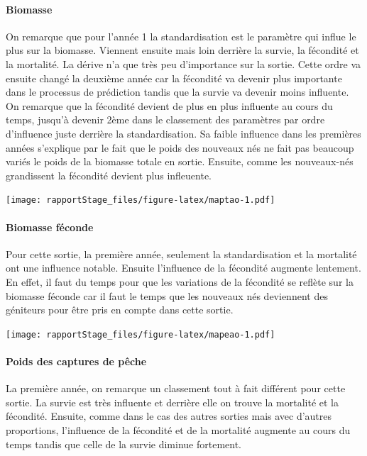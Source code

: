 \documentclass[
]{article}
\begin{document}
\hypertarget{biomasse-7}{%
\paragraph{Biomasse}\label{biomasse-7}}

On remarque que pour l'année 1 la standardisation est le paramètre qui
influe le plus sur la biomasse. Viennent ensuite mais loin derrière la
survie, la fécondité et la mortalité. La dérive n'a que très peu
d'importance sur la sortie. Cette ordre va ensuite changé la deuxième
année car la fécondité va devenir plus importante dans le processus de
prédiction tandis que la survie va devenir moins influente. On remarque
que la fécondité devient de plus en plus influente au cours du temps,
jusqu'à devenir 2ème dans le classement des paramètres par ordre
d'influence juste derrière la standardisation. Sa faible influence dans
les premières années s'explique par le fait que le poids des nouveaux
nés ne fait pas beaucoup variés le poids de la biomasse totale en
sortie. Ensuite, comme les nouveaux-nés grandissent la fécondité devient
plus infleuente.

\texttt{[image: rapportStage\_files/figure-latex/maptao-1.pdf]}

\hypertarget{biomasse-fuxe9conde-1}{%
\paragraph{Biomasse féconde}\label{biomasse-fuxe9conde-1}}

Pour cette sortie, la première année, seulement la standardisation et la
mortalité ont une influence notable. Ensuite l'influence de la fécondité
augmente lentement. En effet, il faut du temps pour que les variations
de la fécondité se reflète sur la biomasse féconde car il faut le temps
que les nouveaux nés deviennent des géniteurs pour être pris en compte
dans cette sortie.

\texttt{[image: rapportStage\_files/figure-latex/mapeao-1.pdf]}

\hypertarget{poids-des-captures-de-puxeache-2}{%
\paragraph{Poids des captures de
pêche}\label{poids-des-captures-de-puxeache-2}}

La première année, on remarque un classement tout à fait différent pour
cette sortie. La survie est très influente et derrière elle on trouve la
mortalité et la fécondité. Ensuite, comme dans le cas des autres sorties
mais avec d'autres proportions, l'influence de la fécondité et de la
mortalité augmente au cours du temps tandis que celle de la survie
diminue fortement.
\end{document}
